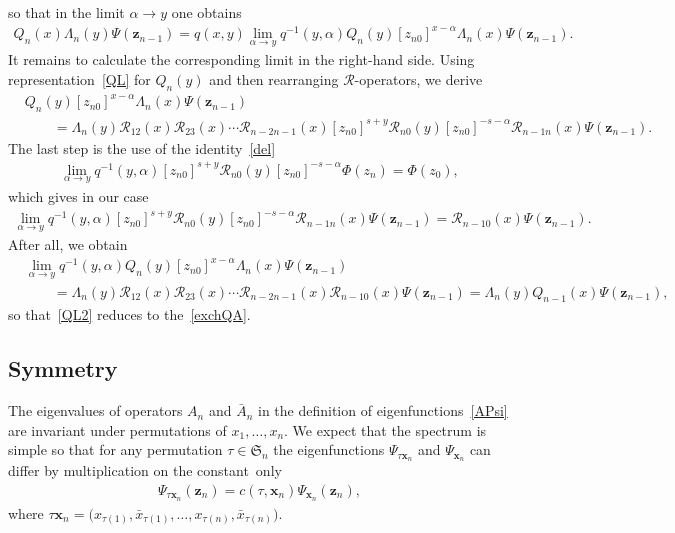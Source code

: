 \documentclass[pdftex]{sigma}
\numberwithin{equation}{section}
\begin{document}
so that in the limit $\alpha \to y$ one obtains
\begin{align}\label{QL2}
 Q_n( x) \Lambda_{n}(y) \Psi(\bm z_{n-1}) = q(x,y)
\lim\limits_{\alpha\to y}
q^{-1}(y,\alpha) Q_n(y)
[z_{n 0}]^{x-\alpha} \Lambda_{n}(x) \Psi(\bm z_{n-1}) .
\end{align}
It remains to calculate the corresponding limit
in the right-hand side. Using representation~\eqref{QL} for $Q_n(y)$ and
then rearranging $\mathcal{R}$-operators, we derive
\begin{align*}
&
Q_n(y)
[z_{n 0}]^{x-\alpha} \Lambda_{n}(x) \Psi(\bm z_{n-1}) \\
&\qquad{} =
\Lambda_n(y) \mathcal{R}_{12}(x)\mathcal{R}_{23}(x)\cdots
\mathcal{R}_{n-2 n-1}(x)
[z_{n0}]^{s+y} \mathcal{R}_{n 0}(y) [z_{n0}]^{-s-\alpha}
\mathcal{R}_{n-1 n}(x) \Psi(\bm z_{n-1}) .
\end{align*}
The last step is the use of the identity~\eqref{del}
\begin{align*}
\lim\limits_{\alpha\to y}
q^{-1}(y,\alpha)
[z_{n0}]^{s+y} \mathcal{R}_{n 0}(y) [z_{n0}]^{-s-\alpha} \Phi(z_n) =
\Phi(z_0),
\end{align*}
which gives in our case
\begin{align*}
\lim\limits_{\alpha\to y}
q^{-1}(y,\alpha)
[z_{n0}]^{s+y} \mathcal{R}_{n 0}(y) [z_{n0}]^{-s-\alpha}
\mathcal{R}_{n-1 n}(x) \Psi(\bm z_{n-1}) =
\mathcal{R}_{n-1 0}(x) \Psi(\bm z_{n-1}) .
\end{align*}
After all, we obtain
\begin{align*}
&
\lim\limits_{\alpha\to y}
q^{-1}(y,\alpha) Q_n(y)
[z_{n 0}]^{x-\alpha} \Lambda_{n}(x) \Psi(\bm z_{n-1}) \\
&
\qquad{}= \Lambda_n(y) \mathcal{R}_{12}(x)\mathcal{R}_{23}(x)\cdots
\mathcal{R}_{n-2 n-1}(x) \mathcal{R}_{n-1 0}(x) \Psi(\bm z_{n-1}) =
\Lambda_n(y) Q_{n-1}(x) \Psi(\bm z_{n-1}) ,
\end{align*}
so that~\eqref{QL2} reduces to the~\eqref{exchQA}.


\subsection{Symmetry} \label{sect:PermSym}

The eigenvalues of operators $A_n$ and $\bar{A}_n$ in the
definition of eigenfunctions~\eqref{APsi} are invariant under
permutations of $x_1, \dots, x_n$.
We expect that the spectrum is simple so that for any
permutation $\tau \in \mathfrak{S}_n$ the eigenfunctions
$\Psi_{\tau \bm x_n}$ and $\Psi_{\bm x_n}$ can differ by
multiplication on the constant~only
\begin{align*}
\Psi_{\tau \bm x_n}(\bm z_n) =
c(\tau,\bm x_n) \Psi_{\bm x_n}(\bm z_n) ,
\end{align*}
where $\tau \bm x_n = \bigl(x_{\tau(1)},\bar{x}_{\tau(1)}, \dots , x_{\tau(n)},\bar{x}_{\tau(n)}\bigr)$.
\end{document}
